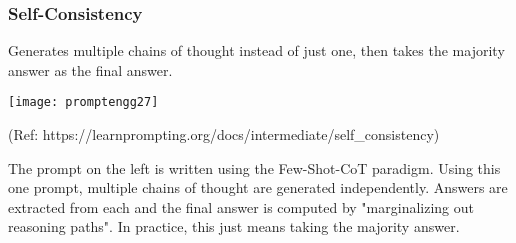   
  
  








\begin{frame}[fragile]\frametitle{Self-Consistency}

Generates multiple chains of thought instead of just one, then takes the majority answer as the final answer.

\begin{center}
\texttt{[image: promptengg27]}

{\tiny (Ref: https://learnprompting.org/docs/intermediate/self\_consistency)}

\end{center}		

The prompt on the left is written using the Few-Shot-CoT paradigm. Using this one prompt, multiple chains of thought are generated independently. Answers are extracted from each and the final answer is computed by "marginalizing out reasoning paths". In practice, this just means taking the majority answer.

\end{frame}


